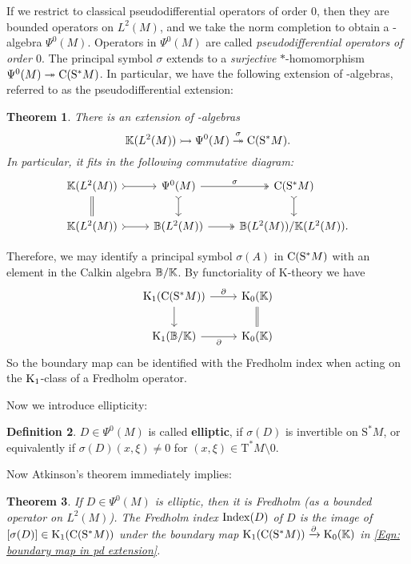 \documentclass[reqno]{scrartcl}
\newtheorem{theorem}{Theorem}[section]
\theoremstyle{definition}
\newtheorem{definition}[theorem]{Definition}
\theoremstyle{remark}
\begin{document}
If we restrict to classical pseudodifferential operators of order 0, then they are bounded operators on $L^2(M)$, and we take the norm completion to obtain a \Cst-algebra $\Psi^0(M)$. Operators in $\Psi^0(M)$ are called \emph{pseudodifferential operators of order $0$}. The principal symbol $\sigma$ extends to a \emph{surjective} $\ast$-homomorphism $\Psi^0(M)\twoheadrightarrow\mathrm{C}(\mathrm{S}^*M)$. In particular, we have the following extension of \Cst-algebras, referred to as the pseudodifferential extension:

\begin{theorem}
There is an extension of \Cst-algebras
\[ \mathbb{K}(L^2(M))\rightarrowtail\Psi^0(M)\overset{\sigma}{\twoheadrightarrow}\mathrm{C}(\mathrm{S}^*M). \]
In particular, it fits in the following commutative diagram:
\[ \begin{tikzcd}
\Cpt(L^2(M)) \arrow[r, tail] \arrow[d, equal] & \Psi^0(M) \arrow[r, two heads, "\sigma"] \arrow[d, tail] & \Cont(\mathrm{S}^*M) \arrow[d, tail] \\
\Cpt(L^2(M)) \arrow[r, tail]                                & \Bdd(L^2(M)) \arrow[r, two heads]                & \Bdd(L^2(M))/\Cpt(L^2(M)).      
\end{tikzcd} \]
\end{theorem}

Therefore, we may identify a principal symbol $\sigma(A)$ in $\mathrm{C}(\mathrm{S}^*M)$ with an element in the Calkin algebra $\mathbb{B}/\mathbb{K}$. By functoriality of K-theory we have
\begin{equation} \label{Eqn: boundary map in pd extension}
\begin{tikzcd}
\K_1(\Cont(\mathrm{S}^*M)) \arrow[d] \arrow[r, "\partial"] & \K_0(\Cpt) \arrow[d,equal] \\
\K_1(\Bdd/\Cpt)\arrow[r, "\partial"'] & \K_0(\Cpt)
\end{tikzcd}
\end{equation}
So the boundary map can be identified with the Fredholm index when acting on the $\operatorname{K}_1$-class of a Fredholm operator. 

Now we introduce ellipticity:
\begin{definition}
$D\in\Psi^0(M)$ is called \textbf{elliptic}, if $\sigma(D)$ is invertible on $\mathrm{S}^*M$, or equivalently if $\sigma(D)(x,\xi)\neq 0$ for $(x,\xi)\in \mathrm{T}^*M\setminus 0$.
\end{definition}

Now Atkinson's theorem immediately implies:

\begin{theorem}
If $D\in\Psi^0(M)$ is elliptic, then it is Fredholm (as a bounded operator on $L^2(M)$). The Fredholm index $\operatorname{Index}(D)$ of $D$ is the image of $[\sigma(D)]\in\operatorname{K}_1(\mathrm{C}(\mathrm{S}^*M))$ under the boundary map $\operatorname{K}_1(\mathrm{C}(\mathrm{S}^*M))\xrightarrow{\partial}\operatorname{K}_0(\mathbb{K})$ in \eqref{Eqn: boundary map in pd extension}.
\end{theorem}
\end{document}
